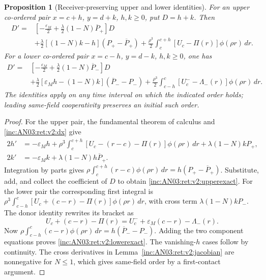 \documentclass[11pt]{article}
\numberwithin{equation}{section}
\newtheorem{proposition}[theorem]{Proposition}
\theoremstyle{remark}\newtheorem{remark}[theorem]{Remark}
\newcommand{\dd}{\,d}
\newcommand{\1}{\mathbf 1}
\begin{document}
\begin{proposition}[Receiver-preserving upper and lower identities]
\label{inc:AN03:ret:v2:averagedpair}
For an upper co-ordered pair $x=c+h$, $y=d+k$, $h,k\ge0$, put $D=h+k$.
Then
\begin{align}
 D'={}&\left[-\frac{\varepsilon_M}{2}
       +\frac\lambda2(1-N)\overline P_+\right]D\nonumber\\
 &+\frac\lambda2[(1-N)k-h](P_+-\overline P_+)
 +\frac{\rho^3}{2}\int_c^{c+h}[U_c-\Pi(r)]\phi(\rho r)\dd r.
 \label{inc:AN03:ret:v2:upperexact}
\end{align}
For a lower co-ordered pair $x=c-h$, $y=d-k$, $h,k\ge0$, one has
\begin{align}
 D'={}&\left[-\frac{\varepsilon_M}{2}
       +\frac\lambda2(1-N)\overline P_-\right]D\nonumber\\
 &+\frac\lambda2[\varepsilon_M h-(1-N)k]
       (\overline P_--P_-)
 +\frac{\rho^3}{2}\int_{c-h}^{c}[U_c^--\Lambda_-(r)]\phi(\rho r)\dd r.
 \label{inc:AN03:ret:v2:lowerexact}
\end{align}
The identities apply on any time interval on which the indicated order
holds; leading same-field cooperativity preserves an initial such order.
\end{proposition}
\begin{proof}
For the upper pair, the fundamental theorem of calculus and
\eqref{inc:AN03:ret:v2:dx} give
\begin{align*}
 2h'&=-\varepsilon_Mh+
 \rho^3\int_c^{c+h}[U_c-(r-c)-\Pi(r)]\phi(\rho r)\dd r
 +\lambda(1-N)kP_+,\\
 2k'&=-\varepsilon_Mk+\lambda(1-N)h\overline P_+.
\end{align*}
Integration by parts gives
$\rho\int_c^{c+h}(r-c)\phi(\rho r)\dd r
=h(P_+-\overline P_+)$.
Substitute, add, and collect the coefficient of $D$ to obtain
\eqref{inc:AN03:ret:v2:upperexact}.
For the lower pair the corresponding first integral is
$\rho^3\int_{c-h}^{c}[U_c+(c-r)-\Pi(r)]\phi(\rho r)\dd r$,
with cross term $\lambda(1-N)kP_-$. The donor identity rewrites its
bracket as
\[
 U_c+(c-r)-\Pi(r)=U_c^-+\varepsilon_M(c-r)-\Lambda_-(r).
\]
Now
$\rho\int_{c-h}^{c}(c-r)\phi(\rho r)\dd r
=h(\overline P_--P_-)$.
Adding the two component equations proves
\eqref{inc:AN03:ret:v2:lowerexact}.
The vanishing-$h$ cases follow by continuity. The cross derivatives in
Lemma~\ref{inc:AN03:ret:v2:jacobian} are nonnegative for $N\le1$,
which gives same-field order by a first-contact argument.
\end{proof}
\end{document}
